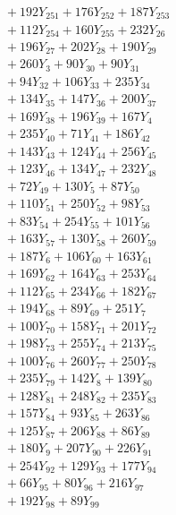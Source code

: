 \documentclass[a4paper,10pt]{article}
\begin{document}
{\begin{align}
&\quad  + 192Y_{251} + 176Y_{252} + 187Y_{253} \\[0.5ex]
&\quad  + 112Y_{254} + 160Y_{255} + 232Y_{26} \\[0.5ex]
&\quad  + 196Y_{27} + 202Y_{28} + 190Y_{29} \\[0.5ex]
&\quad  + 260Y_{3} + 90Y_{30} + 90Y_{31} \\[0.5ex]
&\quad  + 94Y_{32} + 106Y_{33} + 235Y_{34} \\[0.5ex]
&\quad  + 134Y_{35} + 147Y_{36} + 200Y_{37} \\[0.5ex]
&\quad  + 169Y_{38} + 196Y_{39} + 167Y_{4} \\[0.5ex]
&\quad  + 235Y_{40} + 71Y_{41} + 186Y_{42} \\[0.5ex]
&\quad  + 143Y_{43} + 124Y_{44} + 256Y_{45} \\[0.5ex]
&\quad  + 123Y_{46} + 134Y_{47} + 232Y_{48} \\[0.5ex]
&\quad  + 72Y_{49} + 130Y_{5} + 87Y_{50} \\[0.5ex]
&\quad  + 110Y_{51} + 250Y_{52} + 98Y_{53} \\[0.5ex]
&\quad  + 83Y_{54} + 254Y_{55} + 101Y_{56} \\[0.5ex]
&\quad  + 163Y_{57} + 130Y_{58} + 260Y_{59} \\[0.5ex]
&\quad  + 187Y_{6} + 106Y_{60} + 163Y_{61} \\[0.5ex]
&\quad  + 169Y_{62} + 164Y_{63} + 253Y_{64} \\[0.5ex]
&\quad  + 112Y_{65} + 234Y_{66} + 182Y_{67} \\[0.5ex]
&\quad  + 194Y_{68} + 89Y_{69} + 251Y_{7} \\[0.5ex]
&\quad  + 100Y_{70} + 158Y_{71} + 201Y_{72} \\[0.5ex]
&\quad  + 198Y_{73} + 255Y_{74} + 213Y_{75} \\[0.5ex]
&\quad  + 100Y_{76} + 260Y_{77} + 250Y_{78} \\[0.5ex]
&\quad  + 235Y_{79} + 142Y_{8} + 139Y_{80} \\[0.5ex]
&\quad  + 128Y_{81} + 248Y_{82} + 235Y_{83} \\[0.5ex]
&\quad  + 157Y_{84} + 93Y_{85} + 263Y_{86} \\[0.5ex]
&\quad  + 125Y_{87} + 206Y_{88} + 86Y_{89} \\[0.5ex]
&\quad  + 180Y_{9} + 207Y_{90} + 226Y_{91} \\[0.5ex]
&\quad  + 254Y_{92} + 129Y_{93} + 177Y_{94} \\[0.5ex]
&\quad  + 66Y_{95} + 80Y_{96} + 216Y_{97} \\[0.5ex]
&\quad  + 192Y_{98} + 89Y_{99}\nonumber
\end{align}
}
\end{document}
